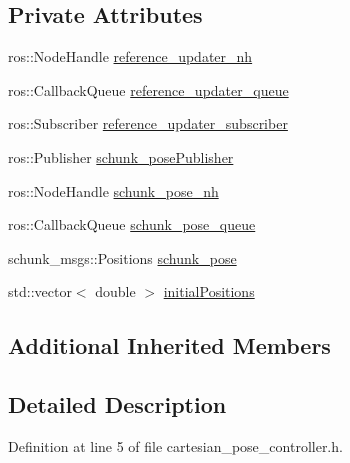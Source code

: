 \subsection*{Private Attributes}
\begin{DoxyCompactItemize}
\item 
ros\-::\-Node\-Handle \hyperlink{classCartesian__pose__controller_ab2d5fe68c8229b6c90f84ac1601eb637}{reference\-\_\-updater\-\_\-nh}
\item 
ros\-::\-Callback\-Queue \hyperlink{classCartesian__pose__controller_a6eea82d82ccd6c925be31c18e1b4a432}{reference\-\_\-updater\-\_\-queue}
\item 
ros\-::\-Subscriber \hyperlink{classCartesian__pose__controller_a9394ae99649279f815c234b1ca7801b6}{reference\-\_\-updater\-\_\-subscriber}
\item 
ros\-::\-Publisher \hyperlink{classCartesian__pose__controller_a9eb38e771e5006950b9a8075a0ea7e49}{schunk\-\_\-pose\-Publisher}
\item 
ros\-::\-Node\-Handle \hyperlink{classCartesian__pose__controller_a41a692189fed59ec8ec8460539f63c66}{schunk\-\_\-pose\-\_\-nh}
\item 
ros\-::\-Callback\-Queue \hyperlink{classCartesian__pose__controller_a5efe52a57e5239b3fd86ff456e94691b}{schunk\-\_\-pose\-\_\-queue}
\item 
schunk\-\_\-msgs\-::\-Positions \hyperlink{classCartesian__pose__controller_a301bc44e901e4837cf036661478354c4}{schunk\-\_\-pose}
\item 
std\-::vector$<$ double $>$ \hyperlink{classCartesian__pose__controller_a42433d7f2e4e03ccaac56e1f9a7a5027}{initial\-Positions}
\end{DoxyCompactItemize}
\subsection*{Additional Inherited Members}


\subsection{Detailed Description}


Definition at line 5 of file cartesian\-\_\-pose\-\_\-controller.\-h.



